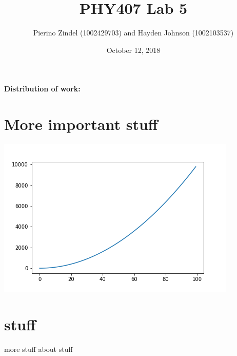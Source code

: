 \documentclass{article}
\title{PHY407 Lab 5}
\author{Pierino Zindel (1002429703) and Hayden Johnson (1002103537)}
\date{October 12, 2018}
\begin{document}
\maketitle

\noindent \textbf{Distribution of work:}

\section{More important stuff}

\includegraphics{../images/name.png}

\section{stuff}
more stuff about stuff
\end{document}
